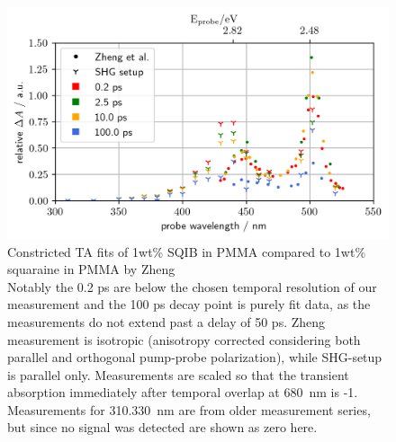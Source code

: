 \documentclass[twoside,openright]{scrreprt}
\begin{document}
\begin{figure}[hbtp]
\centering
\includegraphics[scale=1]{images/TimeResolvedWavScanvsZheng_Zoom.png}
\caption{Constricted TA fits of 1wt\% SQIB in PMMA compared to 1wt\% squaraine in PMMA by Zheng\protect\cite{Zheng2020}\\ Notably the 0.2 ps are below the chosen temporal resolution of our measurement and the 100 ps decay point is purely fit data, as the measurements do not extend past a delay of 50 ps. 
Zheng measurement is isotropic (anisotropy corrected considering both parallel and orthogonal pump-probe polarization), while SHG-setup is parallel only. Measurements are scaled so that the transient absorption immediately after temporal overlap at \SI{680}{\nano\meter} is -1. Measurements for \SIlist{310, 330}{\nano\meter} are from older measurement series, but since no signal was detected are shown as zero here.\label{fig:TA_vsZheng_Zoomed}}
\end{figure}
\end{document}
